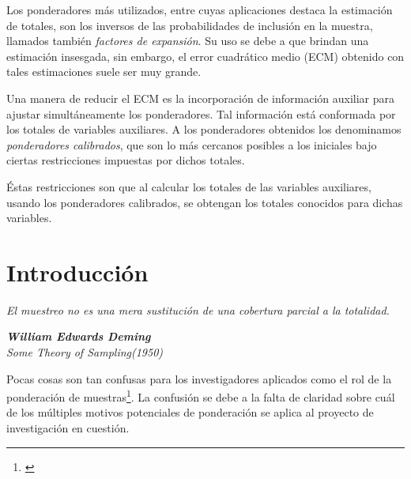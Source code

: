 \documentclass[a4paper,twoside,openright,12pt]{book}
\theoremstyle{definition}
\numberwithin{equation}{chapter}
\numberwithin{figure}{chapter}
\numberwithin{table}{chapter}
\numberwithin{theorem}{chapter}
\numberwithin{lemma}{chapter}
\begin{document}
Los ponderadores más utilizados, entre cuyas aplicaciones destaca la estimación de totales, son los inversos de las probabilidades de inclusión en la muestra, llamados también \textsl{factores de expansión}. Su uso se debe a que brindan una estimación insesgada, sin embargo, el error cuadrático medio (ECM) obtenido con tales estimaciones suele ser muy grande.

Una manera de reducir el ECM es la incorporación de información auxiliar para ajustar simultáneamente los ponderadores. Tal información está conformada por los totales de variables auxiliares. A los ponderadores obtenidos los denominamos \textsl{ponderadores calibrados}, que son lo más cercanos posibles a los iniciales bajo ciertas restricciones impuestas por dichos totales.

Éstas restricciones son que al calcular los totales de las variables auxiliares, usando los ponderadores calibrados, se obtengan los totales conocidos para dichas variables.


\listoffigures
\listoftables
\chapter*{Introducción}
\epigraph{\textsl{El muestreo no es una mera sustitución de una cobertura parcial a la totalidad.}}{\textit{\textbf{William Edwards Deming}\\ Some Theory of Sampling(1950)}}
Pocas cosas son tan confusas para los investigadores aplicados como el rol de la ponderación de muestras\footnote{\cite{CIS-427247}}. La confusión se debe a la falta de claridad sobre cuál de los múltiples motivos potenciales de ponderación se aplica al proyecto de investigación en cuestión.
\end{document}
